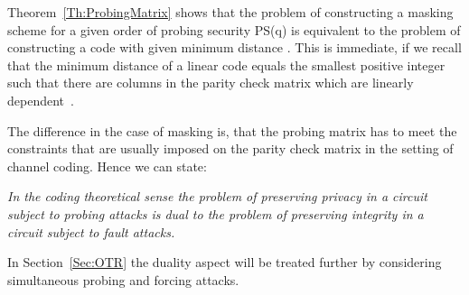 \documentclass[11pt]{llncs}
\begin{document}
Theorem~\ref{Th:ProbingMatrix} shows that the problem of constructing a
masking scheme for a given order of probing security PS(q) is
equivalent to the problem of constructing a code with given minimum
distance . This is immediate, if we recall that the
minimum distance  of a linear code equals the smallest positive
integer  such that there are  columns in the parity check
matrix which are linearly dependent~\cite{MacWilliams2006TheoryofError-Correcting}.

The difference in the case of masking is, that the probing matrix
has to meet the constraints that are usually imposed on the parity check matrix
in the setting of channel coding.
Hence we can state:
\begin{center}
\begin{minipage}{0.83\textwidth}
 \em In the coding theoretical sense
     the problem of preserving privacy in a circuit subject to probing attacks
     is dual to
     the problem of preserving integrity in a circuit subject to fault attacks.
 \end{minipage}
\end{center}
In Section~\ref{Sec:OTR} the duality aspect will be treated further by
considering simultaneous probing and forcing attacks.
\end{document}
